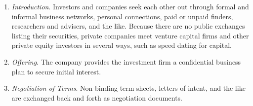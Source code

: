 \documentclass{article}
\begin{document}
    \begin{enumerate}
      \item \textit{Introduction}. Investors and companies seek each other out through formal and informal business networks, personal connections, paid or unpaid finders, researchers and advisers, and the like. Because there are no public exchanges listing their securities, private companies meet venture capital firms and other private equity investors in several ways, such as speed dating for capital. 

      \item \textit{Offering}. The company provides the investment firm a confidential business plan to secure initial interest. 

      \item \textit{Negotiation of Terms}. Non-binding term sheets, letters of intent, and the like are exchanged back and forth as negotiation documents. 


\end{enumerate}
\end{document}
